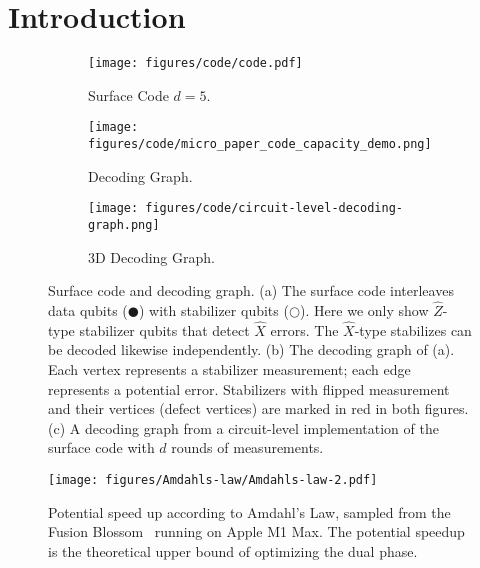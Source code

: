 \section{Introduction}

\begin{figure*}[t]
\newcommand{\subfiglinewidth}{0.325\linewidth}
\newcommand{\codelinewidth}{\linewidth}
\begin{minipage}{0.7\linewidth}
    \centering
    \begin{subfigure}{\subfiglinewidth}
        \centering
        \texttt{[image: figures/code/code.pdf]}
        \caption{Surface Code $d=5$.}
        \label{fig:bkgd-surface-code}
    \end{subfigure}
    \begin{subfigure}{\subfiglinewidth}
        \centering
        \texttt{[image: figures/code/micro\_paper\_code\_capacity\_demo.png]}
        \caption{Decoding Graph.}
        \label{fig:bkgd-code-capacity}
    \end{subfigure}
    \begin{subfigure}{\subfiglinewidth}
        \centering
        \texttt{[image: figures/code/circuit-level-decoding-graph.png]}
        \caption{3D Decoding Graph.}
        \label{fig:bkgd-circuit-level}
    \end{subfigure}
    \caption{Surface code and decoding graph. (a) The surface code interleaves data qubits ($\CIRCLE$) with stabilizer qubits ($\Circle$). Here we only show $\hat{Z}$-type stabilizer qubits that detect $\hat{X}$ errors. The $\hat{X}$-type stabilizes can be decoded likewise independently. (b) The decoding graph of (a). Each vertex represents a stabilizer measurement; each edge represents a potential error. Stabilizers with flipped measurement and their vertices (defect vertices) are marked in red in both figures. (c) A decoding graph from a circuit-level implementation of the surface code with $d$ rounds of measurements.}
    \label{fig:bkgd}
\end{minipage}
\hfill
\begin{minipage}{0.27\linewidth}
    \begin{minipage}{\linewidth}
        \centering
        \texttt{[image: figures/Amdahls-law/Amdahls-law-2.pdf]}
    \end{minipage}
    \caption{Potential speed up according to Amdahl's Law, sampled from the Fusion Blossom~\cite{wu2023qce} running on Apple M1 Max. The potential speedup is the theoretical upper bound of optimizing the dual phase.}
    \label{fig:amdahls-law}
\end{minipage}
\end{figure*}

